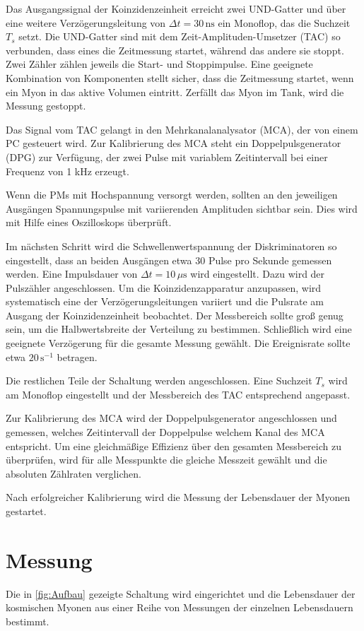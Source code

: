 Das Ausgangssignal der Koinzidenzeinheit erreicht zwei UND-Gatter und über eine weitere Verzögerungsleitung von $\Delta t = 30 \, \text{ns}$ ein Monoflop, das die Suchzeit $T_s$ setzt. Die UND-Gatter sind mit dem Zeit-Amplituden-Umsetzer (TAC) so verbunden, dass eines die Zeitmessung startet, während das andere sie stoppt. Zwei Zähler zählen jeweils die Start- und Stoppimpulse. Eine geeignete Kombination von Komponenten stellt sicher, dass die Zeitmessung startet, wenn ein Myon in das aktive Volumen eintritt. Zerfällt das Myon im Tank, wird die Messung gestoppt.

Das Signal vom TAC gelangt in den Mehrkanalanalysator (MCA), der von einem PC gesteuert wird. Zur Kalibrierung des MCA steht ein Doppelpulsgenerator (DPG) zur Verfügung, der zwei Pulse mit variablem Zeitintervall bei einer Frequenz von 1 kHz erzeugt.

Wenn die PMs mit Hochspannung versorgt werden, sollten an den jeweiligen Ausgängen Spannungspulse mit variierenden Amplituden sichtbar sein. Dies wird mit Hilfe eines Oszilloskops überprüft.

Im nächsten Schritt wird die Schwellenwertspannung der Diskriminatoren so eingestellt, dass an beiden Ausgängen etwa 30 Pulse pro Sekunde gemessen werden. Eine Impulsdauer von $\Delta t = 10 \, \mu\text{s}$ wird eingestellt. Dazu wird der Pulszähler angeschlossen. Um die Koinzidenzapparatur anzupassen, wird systematisch eine der Verzögerungsleitungen variiert und die Pulsrate am Ausgang der Koinzidenzeinheit beobachtet. Der Messbereich sollte groß genug sein, um die Halbwertsbreite der Verteilung zu bestimmen. Schließlich wird eine geeignete Verzögerung für die gesamte Messung gewählt. Die Ereignisrate sollte etwa $20 \, \text{s}^{-1}$ betragen.

Die restlichen Teile der Schaltung werden angeschlossen. Eine Suchzeit $T_s$ wird am Monoflop eingestellt und der Messbereich des TAC entsprechend angepasst.

Zur Kalibrierung des MCA wird der Doppelpulsgenerator angeschlossen und gemessen, welches Zeitintervall der Doppelpulse welchem Kanal des MCA entspricht. Um eine gleichmäßige Effizienz über den gesamten Messbereich zu überprüfen, wird für alle Messpunkte die gleiche Messzeit gewählt und die absoluten Zählraten verglichen.

Nach erfolgreicher Kalibrierung wird die Messung der Lebensdauer der Myonen gestartet.

\section{Messung}

Die in \autoref{fig:Aufbau} gezeigte Schaltung wird eingerichtet und die Lebensdauer der kosmischen Myonen aus einer Reihe von Messungen der einzelnen Lebensdauern bestimmt.
